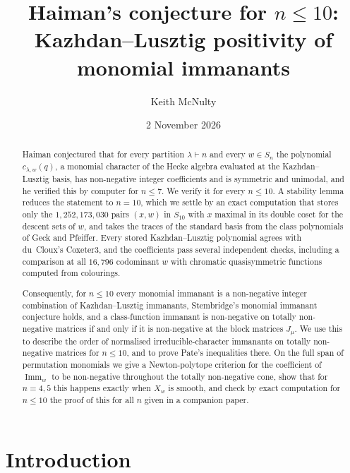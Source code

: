 \documentclass[11pt]{amsart}
\title[Haiman's conjecture for $n\le10$]{Haiman's conjecture for $n\le10$:\\ Kazhdan--Lusztig positivity of monomial immanants}
\author{Keith McNulty}
\date{2 November 2026}
\theoremstyle{definition}
\theoremstyle{remark}
\newcommand{\Imm}{\operatorname{Imm}}
\begin{document}
\begin{abstract}
Haiman conjectured that for every partition $\lambda\vdash n$ and every $w\in S_n$ the polynomial $c_{\lambda,w}(q)$, a monomial character of the Hecke algebra evaluated at the Kazhdan--Lusztig basis, has non-negative integer coefficients and is symmetric and unimodal, and he verified this by computer for $n\le7$. We verify it for every $n\le10$. A stability lemma reduces the statement to $n=10$, which we settle by an exact computation that stores only the $1{,}252{,}173{,}030$ pairs $(x,w)$ in $S_{10}$ with $x$ maximal in its double coset for the descent sets of $w$, and takes the traces of the standard basis from the class polynomials of Geck and Pfeiffer. Every stored Kazhdan--Lusztig polynomial agrees with du~Cloux's \textsf{Coxeter3}, and the coefficients pass several independent checks, including a comparison at all $16{,}796$ codominant $w$ with chromatic quasisymmetric functions computed from colourings.

Consequently, for $n\le10$ every monomial immanant is a non-negative integer combination of Kazhdan--Lusztig immanants, Stembridge's monomial immanant conjecture holds, and a class-function immanant is non-negative on totally non-negative matrices if and only if it is non-negative at the block matrices $J_\mu$. We use this to describe the order of normalised irreducible-character immanants on totally non-negative matrices for $n\le10$, and to prove Pate's inequalities there. On the full span of permutation monomials we give a Newton-polytope criterion for the coefficient of $\Imm_w$ to be non-negative throughout the totally non-negative cone, show that for $n=4,5$ this happens exactly when $X_w$ is smooth, and check by exact computation for $n\le10$ the proof of this for all $n$ given in a companion paper.
\end{abstract}

\maketitle

\section{Introduction}\label{sec:intro}
\end{document}
